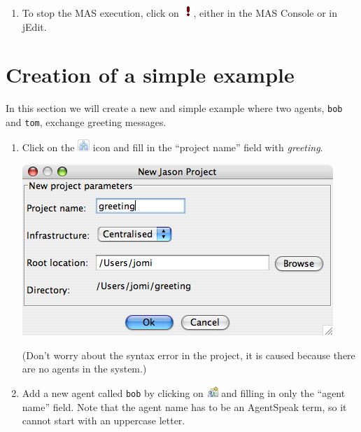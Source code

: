 \documentclass[a4paper]{article}
\begin{document}
\begin{enumerate}
\item To stop the MAS execution, click
  on \includegraphics{figures/suspend.png}, either in the MAS Console
  or in jEdit.

\end{enumerate}

\section{Creation of a simple example}

In this section we will create a new and simple example where two
agents, \texttt{bob} and \texttt{tom}, exchange greeting messages.

\begin{enumerate}

\item Click on the \includegraphics{figures/newProject.gif} icon and
  fill in the ``project name'' field with \emph{greeting}.

  \includegraphics{figures/screen-newproject.png}

  (Don't worry about the syntax error in the project, it is caused
  because there are no agents in the system.)

\item Add a new agent called \texttt{bob} by clicking
  on \includegraphics{figures/newAgent.gif} and filling in only the
  ``agent name'' field. Note that the agent name has to be an
  AgentSpeak term, so it cannot start with an uppercase letter.


\end{enumerate}
\end{document}
